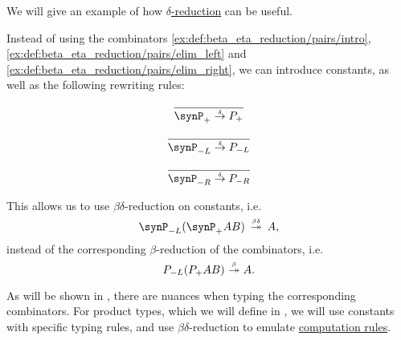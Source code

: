 \begin{remark}\label{rem:delta_reduction}
  We will give an example of how \hyperref[def:delta_reduction]{\( \delta \)-reduction} can be useful.

  Instead of using the combinators \ref{ex:def:beta_eta_reduction/pairs/intro}, \ref{ex:def:beta_eta_reduction/pairs/elim_left} and \ref{ex:def:beta_eta_reduction/pairs/elim_right}, we can introduce constants, as well as the following rewriting rules:
  \begin{paracol}{3}
    \begin{nthcolumn}{0}
      \ParacolAlignmentHack
      \begin{equation*}
        \begin{prooftree}
          \infer0{ \synP_+ \dred P_+ }
        \end{prooftree}
      \end{equation*}
    \end{nthcolumn}

    \begin{nthcolumn}{1}
      \ParacolAlignmentHack
      \begin{equation*}
        \begin{prooftree}
          \infer0{ \synP_{-L} \dred P_{-L} }
        \end{prooftree}
      \end{equation*}
    \end{nthcolumn}

    \begin{nthcolumn}{2}
      \ParacolAlignmentHack
      \begin{equation*}
        \begin{prooftree}
          \infer0{ \synP_{-R} \dred P_{-R} }
        \end{prooftree}
      \end{equation*}
    \end{nthcolumn}
  \end{paracol}

  This allows us to use \( \beta\delta \)-reduction on constants, i.e.
  \begin{equation*}
    \synP_{-L} (\synP_+ A B) \redrel*{\beta\delta} A,
  \end{equation*}
  instead of the corresponding \( \beta \)-reduction of the combinators, i.e.
  \begin{equation*}
    P_{-L} (P_+ A B) \bred* A.
  \end{equation*}

  As will be shown in , there are nuances when typing the corresponding combinators. For product types, which we will define in , we will use constants with specific typing rules, and use \( \beta\delta \)-reduction to emulate \hyperref[rem:type_theory_rule_classification/equality/comp]{computation rules}.
\end{remark}

